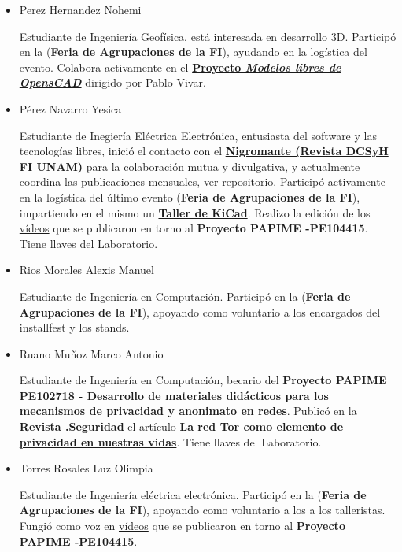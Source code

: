 \documentclass[a4paper,11pt]{article}                 %
\begin{document}
\begin{itemize}
    \item Perez Hernandez Nohemi
    
    Estudiante de Ingeniería Geofísica, está interesada en desarrollo 3D. Participó en la (\textbf{Feria de Agrupaciones de la FI}), ayudando en la logística del evento. Colabora activamente en el \href{https://github.com/LIDSOL/OpenSCAD-free-models}{\textbf{Proyecto \textit{Modelos libres de OpensCAD}}} dirigido por Pablo Vivar.
    
    \item Pérez Navarro Yesica 
    
    Estudiante de Inegiería Eléctrica Electrónica, entusiasta del software y las tecnologías libres, inició el contacto con el \href{https://issuu.com/nigromantefi}{\textbf{Nigromante  (Revista DCSyH FI  UNAM)}} para la colaboración mutua y divulgativa, y actualmente coordina las publicaciones mensuales, \href{https://github.com/LIDSOL/material-didactico/tree/master/nigromante}{ver repositorio}. Participó activamente en la logística del último evento (\textbf{Feria de Agrupaciones de la FI}),  impartiendo en el mismo un \href{https://github.com/yesn7/taller-kicad/}{\textbf{Taller de KiCad}}. Realizo la edición de los \href{https://www.youtube.com/channel/UCwHFqMqxUcCAJSdek3e4zOw}{vídeos} que se publicaron en torno al  \textbf{Proyecto PAPIME -PE104415}. Tiene llaves del Laboratorio.
    
    \item Rios Morales Alexis Manuel
    
    Estudiante de Ingeniería en Computación. Participó en la (\textbf{Feria de Agrupaciones de la FI}), apoyando como voluntario a los encargados del installfest y  los stands.
     
    \item Ruano Muñoz Marco Antonio
    
    Estudiante de Ingeniería en Computación, becario del \textbf{Proyecto PAPIME PE102718 - Desarrollo de materiales didácticos para los mecanismos de privacidad y anonimato en redes}. Publicó en la \textbf{Revista .Seguridad} el artículo \href{https://revista.seguridad.unam.mx/numero30/la-red-tor-como-elemento-de-privacidad-en-nuestras-vidas}{\textbf{La red Tor como elemento de privacidad en nuestras vidas}}. Tiene llaves del Laboratorio.
    
    \item Torres Rosales Luz Olimpia
    
    Estudiante de Ingeniería eléctrica electrónica. Participó en la (\textbf{Feria de Agrupaciones de la FI}), apoyando como voluntario a los a los talleristas. Fungió como voz en \href{https://www.youtube.com/channel/UCwHFqMqxUcCAJSdek3e4zOw}{vídeos} que se publicaron en torno al  \textbf{Proyecto PAPIME -PE104415}.
    

\end{itemize}
\end{document}
